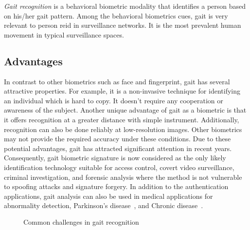 \textit{Gait recognition} is a behavioral biometric modality that identifies a person based on his/her gait pattern. Among the behavioral biometrics cues, gait is very relevant to person \gls{reid} in surveillance networks. It is the most prevalent human movement in typical surveillance spaces. 


\subsection{Advantages}
In contrast to other biometrics such as face and fingerprint, gait has several attractive properties. For example, it is a non-invasive technique for identifying an individual which is hard to copy. It doesn't require any cooperation or awareness of the subject. Another unique advantage of gait as a biometric is that it offers recognition at a greater distance with simple instrument. Additionally, recognition can also be done reliably at low-resolution images. Other biometrics may not provide the required accuracy under these conditions. Due to these potential advantages, gait has attracted significant attention in recent years. Consequently, gait biometric signature is now considered as the only likely identification technology suitable for access control, covert video surveillance, criminal investigation, and forensic analysis where the method is not vulnerable to spoofing attacks and signature forgery. In addition to the authentication applications, gait analysis can also be used in medical applications for abnormality detection, Parkinson's disease~\cite{Michele_17}, and Chronic disease~\cite{Juen_14}.


\begin{figure}
	\caption[A basic topology of person re-identification in a multi-camera network environment]
	{Common challenges in gait recognition \label{fig:gait_challenges}}
\end{figure}

